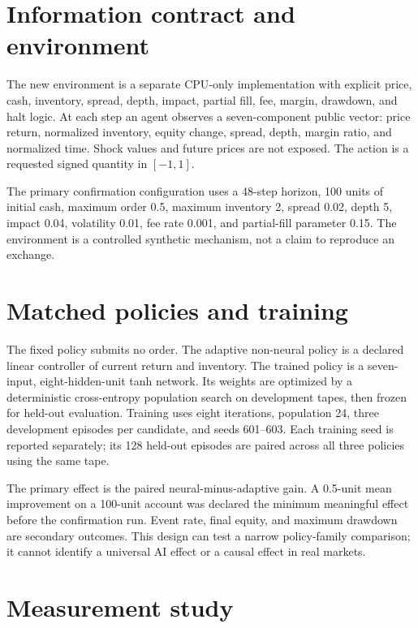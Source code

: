 \documentclass[10pt]{article}
\begin{document}
\section{Information contract and environment}

The new environment is a separate CPU-only implementation with explicit price,
cash, inventory, spread, depth, impact, partial fill, fee, margin, drawdown, and
halt logic. At each step an agent observes a seven-component public vector:
price return, normalized inventory, equity change, spread, depth, margin ratio,
and normalized time. Shock values and future prices are not exposed. The action
is a requested signed quantity in $[-1,1]$.

The primary confirmation configuration uses a 48-step horizon, 100 units of
initial cash, maximum order 0.5, maximum inventory 2, spread 0.02, depth 5,
impact 0.04, volatility 0.01, fee rate 0.001, and partial-fill parameter 0.15.
The environment is a controlled synthetic mechanism, not a claim to reproduce
an exchange.

\section{Matched policies and training}

The fixed policy submits no order. The adaptive non-neural policy is a declared
linear controller of current return and inventory. The trained policy is a
seven-input, eight-hidden-unit tanh network. Its weights are optimized by a
deterministic cross-entropy population search on development tapes, then frozen
for held-out evaluation. Training uses eight iterations, population 24, three
development episodes per candidate, and seeds 601--603. Each training seed is
reported separately; its 128 held-out episodes are paired across all three
policies using the same tape.

The primary effect is the paired neural-minus-adaptive gain. A 0.5-unit mean
improvement on a 100-unit account was declared the minimum meaningful effect
before the confirmation run. Event rate, final equity, and maximum drawdown are
secondary outcomes. This design can test a narrow policy-family comparison; it
cannot identify a universal AI effect or a causal effect in real markets.

\section{Measurement study}
\end{document}
